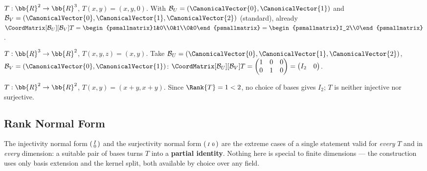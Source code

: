 \begin{example}
    $T: \bb{R}^2 \to \bb{R}^3$, $T(x,y) = (x, y, 0)$.
    With $\mathcal{B}_U = (\CanonicalVector{0}, \CanonicalVector{1})$ and $\mathcal{B}_V = (\CanonicalVector{0}, \CanonicalVector{1}, \CanonicalVector{2})$ (standard), already
    $\CoordMatrix[\mathcal{B}_U][\mathcal{B}_V]{T}
    = \begin{psmallmatrix}1&0\\0&1\\0&0\end{psmallmatrix}
    = \begin{psmallmatrix}I_2\\0\end{psmallmatrix}$.
\end{example}

\begin{example}
    $T: \bb{R}^3 \to \bb{R}^2$, $T(x,y,z) = (x,y)$.
    Take $\mathcal{B}_U = (\CanonicalVector{0}, \CanonicalVector{1}, \CanonicalVector{2})$, $\mathcal{B}_V = (\CanonicalVector{0}, \CanonicalVector{1})$:
    $\CoordMatrix[\mathcal{B}_U][\mathcal{B}_V]{T}
    = \begin{pmatrix}1&0&0\\0&1&0\end{pmatrix}
    = \begin{pmatrix}I_2 & 0\end{pmatrix}$.
\end{example}

\begin{example}
    $T: \bb{R}^2 \to \bb{R}^2$, $T(x,y) = (x+y, x+y)$. Since
    $\Rank{T} = 1 < 2$, no choice of bases gives $I_2$; $T$ is neither injective
    nor surjective.
\end{example}

\subsection{Rank Normal Form}
\label{sec:rank-normal-form}

\begin{remark}
    The injectivity normal form $\begin{psmallmatrix} I \\ 0 \end{psmallmatrix}$ and the
    surjectivity normal form $\begin{psmallmatrix} I & 0 \end{psmallmatrix}$ are the extreme
    cases of a single statement valid for \emph{every} $T$ and in \emph{every} dimension: a
    suitable pair of bases turns $T$ into a \textbf{partial identity}. Nothing here is special to
    finite dimensions --- the construction uses only basis extension and the kernel split, both
    available by choice over any field.
\end{remark}

